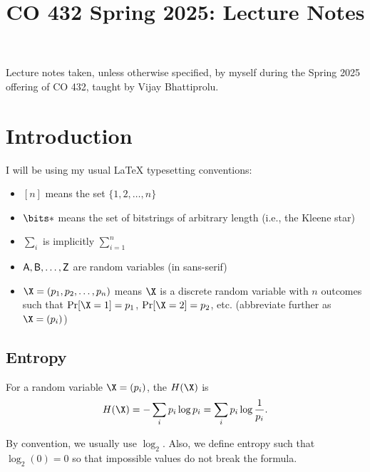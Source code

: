 \documentclass[class=co432,notes,tikz]{agony}
\title{CO 432 Spring 2025: Lecture Notes}
\begin{document}
\renewcommand{\contentsname}{CO 432 Spring 2025:\\{\huge Lecture Notes}}
\thispagestyle{firstpage}
\tableofcontents

Lecture notes taken, unless otherwise specified,
by myself during the Spring 2025 offering of CO 432,
taught by Vijay Bhattiprolu.

\begin{multicols}{2}
  \listoflecture
\end{multicols}

\chapter{Introduction}

\begin{notation}
  I will be using my usual \LaTeX{} typesetting conventions:
  \begin{itemize}[nosep]
    \item $[n]$ means the set $\{1,2,\dotsc,n\}$
    \item $\bits*$ means the set of bitstrings of arbitrary length (i.e., the Kleene star)
    \item $\sum_i$ is implicitly $\sum_{i=1}^n$
    \item $\mathsf A, \mathsf B, \dotsc, \mathsf Z$ are random variables (in sans-serif)
    \item $\X = (p_1,p_2,\dotsc,p_n)$ means $\X$ is a
          discrete random variable with $n$ outcomes
          such that $\Pr[\X = 1] = p_1$, $\Pr[\X=2] = p_2$, etc.
          (abbreviate further as $\X = (p_i)$)
  \end{itemize}
\end{notation}

\section{Entropy}


\begin{defn}[entropy]
  For a random variable $\X = (p_i)$,
  the  $H(\X)$ is
  \[ H(\X) = -\sum_i p_i \log p_i = \sum_i p_i \log \frac{1}{p_i}. \]
\end{defn}

\begin{convention}
  By convention, we usually use $\log_2$.
  Also, we define entropy such that $\log_2(0) = 0$ so that
  impossible values do not break the formula.
\end{convention}
\end{document}
